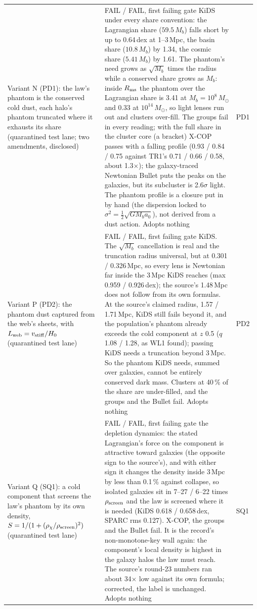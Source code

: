 \documentclass[10pt]{article}
\begin{document}
\begin{longtable}{@{}p{4.4cm}p{8.6cm}p{2.8cm}@{}}
Variant N (PD1): the law's phantom is the conserved cold dust, each halo's phantom truncated where it exhausts its share (quarantined test lane; two amendments, disclosed) & FAIL / FAIL, first failing gate KiDS under every share convention: the Lagrangian share ($59.5\,M_b$) falls short by up to 0.64\,dex at 1--3\,Mpc, the basin share ($10.8\,M_b$) by 1.34, the cosmic share ($5.41\,M_b$) by 1.61. The phantom's need grows as $\sqrt{M_b}$ times the radius while a conserved share grows as $M_b$: inside $R_{\rm ms}$ the phantom over the Lagrangian share is 3.41 at $M_b=10^8\,M_\odot$ and 0.33 at $10^{14}\,M_\odot$, so light lenses run out and clusters over-fill. The groups fail in every reading; with the full share in the cluster core (a bracket) X-COP passes with a falling profile (0.93 / 0.84 / 0.75 against TR1's 0.71 / 0.66 / 0.58, about 1.3$\times$); the galaxy-traced Newtonian Bullet puts the peaks on the galaxies, but its subcluster is 2.6$\sigma$ light. The phantom profile is a closure put in by hand (the dispersion locked to $\sigma^2=\tfrac12\sqrt{GM_ba_0}$), not derived from a dust action. Adopts nothing & PD1\\
Variant P (PD2): the phantom dust captured from the web's sheets, with $L_{\rm web}=v_{\rm stiff}/H_0$ (quarantined test lane) & FAIL / FAIL, first failing gate KiDS. The $\sqrt{M_b}$ cancellation is real and the truncation radius universal, but at 0.301 / 0.326\,Mpc, so every lens is Newtonian far inside the 3\,Mpc KiDS reaches (max 0.959 / 0.926\,dex); the source's 1.48\,Mpc does not follow from its own formulas. At the source's claimed radius, 1.57 / 1.71\,Mpc, KiDS still fails beyond it, and the population's phantom already exceeds the cold component at $z$ 0.5 ($q$ 1.08 / 1.28, as WL1 found); passing KiDS needs a truncation beyond 3\,Mpc. So the phantom KiDS needs, summed over galaxies, cannot be entirely conserved dark mass. Clusters at 40\,\% of the share are under-filled, and the groups and the Bullet fail. Adopts nothing & PD2\\
Variant Q (SQ1): a cold component that screens the law's phantom by its own density, $S=1/(1+(\rho_\chi/\rho_{\rm screen})^2)$ (quarantined test lane) & FAIL / FAIL, first failing gate the depletion dynamics: the stated Lagrangian's force on the component is attractive toward galaxies (the opposite sign to the source's), and with either sign it changes the density inside 3\,Mpc by less than 0.1\,\% against collapse, so isolated galaxies sit in 7--27 / 6--22 times $\rho_{\rm screen}$ and the law is screened where it is needed (KiDS 0.618 / 0.658\,dex, SPARC rms 0.127). X-COP, the groups and the Bullet fail. It is the record's non-monotone-key wall again: the component's local density is highest in the galaxy halos the law must reach. The source's round-23 numbers ran about 34$\times$ low against its own formula; corrected, the label is unchanged. Adopts nothing & SQ1\\

\end{longtable}
\end{document}
